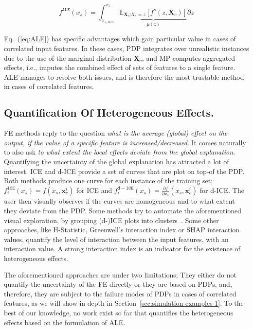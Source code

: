 \documentclass[twoside]{article}
\newcommand{\xc}{\mathbf{x}_c}
\newcommand{\Xcb}{\mathbf{X}_c}
\begin{document}
\begin{equation}
  \label{eq:ALE}
  f^{\mathtt{ALE}}(x_s) = \int_{x_{s,min}}^{x_s} \underbrace{\mathbb{E}_{\Xcb|X_s=z}\left [f^s (z, \Xcb)\right ]}_{\mu(z)} \partial z
\end{equation}


Eq.~(\ref{eq:ALE}) has specific advantages which gain particular value in cases of
correlated input features. In these cases, PDP integrates over
unrealistic instances due to the use of the marginal distribution
\(\mathbf{X}_c \), and MP computes aggregated effects, i.e., imputes
the combined effect of sets of features to a single feature. ALE
manages to resolve both issues, and is therefore the most trustable
method in cases of correlated features.

\subsection{Quantification Of Heterogeneous Effects.}
\label{sec:quant-heter-effects}

FE methods reply to the question \textit{what is the average (global)
  effect on the output, if the value of a specific feature is
  increased/decreased}. It comes naturally to also ask \textit{to what
  extent the local effects deviate from the global
  explanation}. Quantifying the uncertainty of the global explanation
has attracted a lot of interest. ICE and
d-ICE\citep{goldstein2015peeking} provide a set of curves that are
plot on top-of the PDP. Both methods produce one curve for each
instance of the training set;
\(f^{\mathtt{ICE}}_i(x_s) = f(x_s, \xc^i)\) for ICE and
\(f^{\mathtt{d-ICE}}_i(x_s) = \frac{\partial f}{\partial x_s} (x_s,
\xc^i)\) for d-ICE. The user then visually observes if the curves are
homogeneous and to what extent they deviate from the PDP. Some methods
try to automate the aforementioned visual exploration, by grouping
(d-)ICE plots into clusters~\citep{molnar2020model,
  herbinger2022repid, britton2019vine}. Some other approaches, like
H-Statistic\citep{friedman2008predictive}, Greenwell's interaction
index\citep{greenwell2018simple} or SHAP interaction
values\citep{lundberg2018consistent}, quantify the level of
interaction between the input features, with an interaction value. A
strong interaction index is an indicator for the existence of
heterogeneous effects.

The aforementioned approaches are under two limitations; They either
do not quantify the uncertainty of the FE directly or they are based
on PDPs, and, therefore, they are subject to the failure modes of PDPs
in cases of correlated features\citep{baniecki2021fooling}, as we will
show in-depth in Section~\ref{sec:simulation-examples-1}. To the best
of our knowledge, no work exist so far that quantifies the
heterogeneous effects based on the formulation of ALE.
\end{document}
